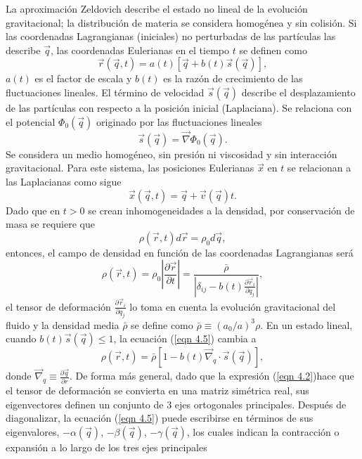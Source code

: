 \documentclass[a4paper,openright,10pt, oneside, final]{book}
\begin{document}
La aproximación Zeldovich describe el estado no lineal de la evolución gravitacional; la distribución de materia se considera homogénea y sin colisión. Si las coordenadas Lagrangianas (iniciales) no perturbadas de las partículas las describe $\vec{q}$, las coordenadas Eulerianas en el tiempo $t$ se definen como
\begin{equation}
\vec{r}(\vec{q}, t) = a(t)[\vec{q} + b(t)\vec{s}(\vec{q})],
\end{equation}
$a(t)$ es el factor de escala y $b(t)$ es la razón de crecimiento de las fluctuaciones lineales. El término de velocidad $\vec{s}(\vec{q})$ describe el desplazamiento de las partículas con respecto a la posición inicial (Laplaciana). Se relaciona con el potencial $\Phi_{0}(\vec{q})$ originado por las fluctuaciones lineales
\begin{equation}
\vec{s}(\vec{q}) = \vec{\nabla}\Phi_{0}(\vec{q}).\label{eqn 4.2}
\end{equation}
Se considera un medio homogéneo, sin presión ni viscosidad y sin interacción gravitacional. Para este sistema, las posiciones Eulerianas $\vec{x}$ en $t$ se relacionan a las Laplacianas como sigue
\begin{equation}
\vec{x}(\vec{q}, t) = \vec{q} + \vec{v}(\vec{q})t.\label{eqn 4.3}
\end{equation}
Dado que en $t>0$ se crean inhomogeneidades a la densidad, por conservación de masa se requiere que 
\begin{equation}
\rho(\vec{r}, t)d\vec{r} = \rho_{0}d\vec{q},\label{eqn 4.4}
\end{equation}
entonces, el campo de densidad en función de las coordenadas Lagrangianas será
\begin{equation}
\rho(\vec{r}, t) = \rho_{0} \left|\frac{\partial \vec{r}}{\partial t}\right|
=
\frac{\bar{\rho}}{\left|\delta_{ij} - b(t)\frac{\partial \vec{r}_{i}}{\partial q_{j}}\right|},\label{eqn 4.5}
\end{equation}
el tensor de deformación $\frac{\partial \vec{r}_{i}}{\partial q_{j}}$ lo toma en cuenta la evolución gravitacional del fluido y la densidad media $\bar{\rho}$ se define como $\bar{\rho}\equiv (a_{0}/a)^{3}\rho$. En un estado lineal, cuando $b(t)\vec{s}(\vec{q}) \leq 1$, la ecuación (\ref{eqn 4.5}) cambia a 
\begin{equation}
\rho(\vec{r}, t) = \bar{\rho}[1 - b(t)\vec{\nabla}_{q}\cdot\vec{s}(\vec{q})],\label{eqn 4.6}
\end{equation}
donde $\vec{\nabla}_{q} \equiv \frac{\partial\vec{q}}{\partial r}$. De forma más general, dado que la expresión (\ref{eqn 4.2})hace que el tensor de deformación se convierta en una matriz simétrica real, sus eigenvectores definen un conjunto de 3 ejes ortogonales principales. Después de diagonalizar, la ecuación (\ref{eqn 4.5}) puede escribirse en términos de sus eigenvalores, $-\alpha(\vec{q})$, $-\beta(\vec{q})$, $-\gamma(\vec{q})$, los cuales indican la contracción o expansión a lo largo de los tres ejes principales
\end{document}
